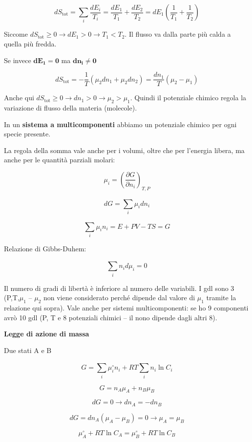 \[dS_{\text{tot}} = \sum_{i}^{}\frac{dE_{i}}{T_{i}} = \frac{dE_{1}}{T_{1}} + \frac{dE_{2}}{T_{2}} = dE_{1}\left( \frac{1}{T_{1}} + \frac{1}{T_{2}} \right)\]

Siccome
\(dS_{\text{tot}} \geq 0 \rightarrow dE_{1} > 0 \rightarrow T_{1} < T_{2}\).
Il flusso va dalla parte più calda a quella più fredda.

Se invece \(\mathbf{d}\mathbf{E}_{\mathbf{1}}\mathbf{= 0}\) ma
\(\mathbf{d}\mathbf{n}_{\mathbf{i}}\mathbf{\neq 0}\)

\[dS_{\text{tot}} = - \frac{1}{T}\left( \mu_{2}dn_{1} + \mu_{2}dn_{2} \right) = \frac{dn_{1}}{T}\left( \mu_{2} - \mu_{1} \right)\]

Anche qui
\(dS_{\text{tot}} \geq 0 \rightarrow dn_{1} > 0 \rightarrow \mu_{2} > \mu_{1}\).
Quindi il potenziale chimico regola la variazione di flusso della
materia (molecole).

In un \textbf{sistema a multicomponenti} abbiamo un potenziale chimico
per ogni specie presente.

La regola della somma vale anche per i volumi, oltre che per l'energia
libera, ma anche per le quantità parziali molari:

\[\mu_{i} = \left( \frac{\partial G}{\partial n_{i}} \right)_{T,P}\]

\[dG = \sum_{i}^{}{\mu_{i}dn_{i}}\]

\[\sum_{i}^{}{\mu_{i}n_{i}} = E + PV - TS = G\]

Relazione di Gibbs-Duhem:

\[\sum_{i}^{}{n_{i}d\mu_{i}} = 0\]

Il numero di gradi di libertà è inferiore al numero delle variabili. I
gdl sono 3 (P,T,\(\mu_{1}\) -- \(\mu_{2}\) non viene considerato perché
dipende dal valore di \(\mu_{1}\) tramite la relazione qui sopra). Vale
anche per sistemi multicomponenti: se ho 9 componenti avrò 10 gdl (P, T
e 8 potenziali chimici -- il nono dipende dagli altri 8).

\textbf{Legge di azione di massa}

Due stati A e B

\[G = \sum_{i}^{}{\mu_{i}^{\circ}n_{i}} + RT\sum_{i}^{}{n_{i}\ln C_{i}}\]

\[G = n_{A}\mu_{A} + n_{B}\mu_{B}\]

\[dG = 0 \rightarrow dn_{A} = - dn_{B}\]

\[dG = dn_{A}\left( \mu_{A} - \mu_{B} \right) = 0 \rightarrow \mu_{A} = \mu_{B}\]

\[\mu_{A}^{\circ} + RT\ln C_{A} = \mu_{B}^{\circ} + RT\ln C_{B}\]


